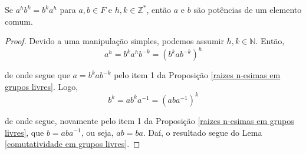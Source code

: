 	\begin{lemma}
		\label{comutatividade fortalecida em grupos livres}
		Se $a^hb^k = b^ka^h$ para $a,b\in F$ e $h,k\in\mathbb{Z}^\ast$, então $a$ e $b$ são potências de um elemento comum.
	\end{lemma}
	\begin{proof}
		Devido a uma manipulação simples, podemos assumir $h,k\in\mathbb{N}$. Então, 
		\begin{equation*}
		a^h = b^ka^hb^{-k} = (b^kab^{-k})^h
		\end{equation*}
		\par\vspace{0.3cm} de onde segue que $a = b^kab^{-k}$ pelo item 1 da Proposição \eqref{raizes n-esimas em grupos livres}. Logo,
		\begin{equation*}
		b^k = ab^ka^{-1} = (aba^{-1})^k
		\end{equation*}
		\par\vspace{0.3cm} de onde segue, novamente pelo item 1 da Proposição \eqref{raizes n-esimas em grupos livres}, que $b = aba^{-1}$, ou seja, $ab = ba$. Daí, o resultado segue do Lema \eqref{comutatividade em grupos livres}.
	\end{proof}
	
